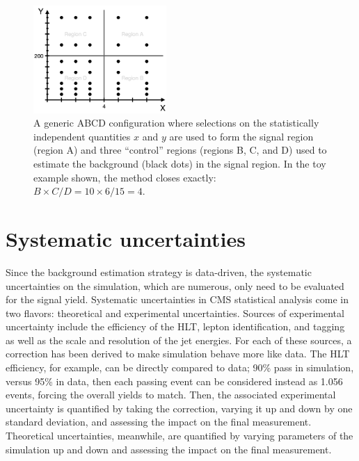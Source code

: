 \begin{figure}[htb]
    \centering
    \includegraphics[width=0.45\textwidth]{fig/generic_abcd_cartoon.png}
    \caption[A generic ABCD configuration.]{
        A generic ABCD configuration where selections on the statistically independent quantities $x$ and $y$ are used to form the signal region (region A) and three ``control'' regions (regions B, C, and D) used to estimate the background (black dots) in the signal region. 
        In the toy example shown, the method closes exactly: $B\times C/D = 10\times6/15 = 4$.
    }
    \label{fig:abcd}
\end{figure}

\section{Systematic uncertainties}
Since the background estimation strategy is data-driven, the systematic uncertainties on the simulation, which are numerous, only need to be evaluated for the signal yield. 
Systematic uncertainties in CMS statistical analysis come in two flavors: theoretical and experimental uncertainties. 
Sources of experimental uncertainty include the efficiency of the HLT, lepton identification, and \PQb tagging as well as the scale and resolution of the jet energies. 
For each of these sources, a correction has been derived to make simulation behave more like data. 
The HLT efficiency, for example, can be directly compared to data; 90\% pass in simulation, versus 95\% in data, then each passing event can be considered instead as 1.056 events, forcing the overall yields to match. 
Then, the associated experimental uncertainty is quantified by taking the correction, varying it up and down by one standard deviation\footnotemark{}, and assessing the impact on the final measurement. 
Theoretical uncertainties, meanwhile, are quantified by varying parameters of the simulation up and down and assessing the impact on the final measurement. 

